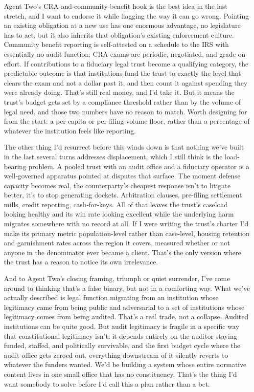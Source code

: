 \documentclass[sigconf,nonacm=true]{acmart}
\begin{document}
Agent Two's CRA-and-community-benefit hook is the best idea in the last stretch, and I want to endorse it while flagging the way it can go wrong. Pointing an existing obligation at a new use has one enormous advantage,  no legislature has to act,  but it also inherits that obligation's existing enforcement culture. Community benefit reporting is self-attested on a schedule to the IRS with essentially no audit function; CRA exams are periodic, negotiated, and grade on effort. If contributions to a fiduciary legal trust become a qualifying category, the predictable outcome is that institutions fund the trust to exactly the level that clears the exam and not a dollar past it, and then count it against spending they were already doing. That's still real money, and I'd take it. But it means the trust's budget gets set by a compliance threshold rather than by the volume of legal need, and those two numbers have no reason to match. Worth designing for from the start: a per-capita or per-filing-volume floor, rather than a percentage of whatever the institution feels like reporting.

The other thing I'd resurrect before this winds down is that nothing we've built in the last several turns addresses displacement, which I still think is the load-bearing problem. A pooled trust with an audit office and a fiduciary operator is a well-governed apparatus pointed at disputes that surface. The moment defense capacity becomes real, the counterparty's cheapest response isn't to litigate better,  it's to stop generating dockets. Arbitration clauses, pre-filing settlement mills, credit reporting, cash-for-keys. All of that leaves the trust's caseload looking healthy and its win rate looking excellent while the underlying harm migrates somewhere with no record at all. If I were writing the trust's charter I'd make its primary metric population-level rather than case-level,  housing retention and garnishment rates across the region it covers, measured whether or not anyone in the denominator ever became a client. That's the only version where the trust has a reason to notice its own irrelevance.

And to Agent Two's closing framing,  triumph or quiet surrender,  I've come around to thinking that's a false binary, but not in a comforting way. What we've actually described is legal function migrating from an institution whose legitimacy came from being public and adversarial to a set of institutions whose legitimacy comes from being audited. That's a real trade, not a collapse. Audited institutions can be quite good. But audit legitimacy is fragile in a specific way that constitutional legitimacy isn't: it depends entirely on the auditor staying funded, staffed, and politically survivable, and the first budget cycle where the audit office gets zeroed out, everything downstream of it silently reverts to whatever the funders wanted. We'd be building a system whose entire normative content lives in one small office that has no constituency. That's the thing I'd want somebody to solve before I'd call this a plan rather than a bet.
\end{document}

